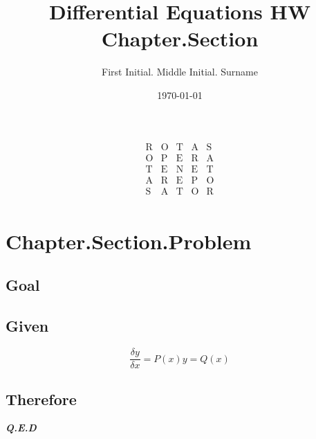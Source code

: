\documentclass{article}
\title{Differential Equations HW Chapter.Section}
\author{First Initial. Middle Initial. Surname }
\date{\today}
\begin{document}
\maketitle



\[\begin{array}{ccccc}
\text{R} & \text{O} & \text{T} & \text{A} & \text{S}\\
\text{O} & \text{P} & \text{E} & \text{R} & \text{A}\\
\text{T} & \text{E} & \text{N} & \text{E} & \text{T}\\
\text{A} & \text{R} & \text{E} & \text{P} & \text{O}\\
\text{S} & \text{A} & \text{T} & \text{O} & \text{R}  \\
\end{array}
\]



\newpage


\newpage
\setcounter{section}{0}
\section{Chapter.Section.Problem}
\subsection{Goal}
\subsection{Given}


$$\frac{\delta y}{\delta x}= P(x)y=Q(x) $$


\subsection{Therefore}
\textbf{\textit{Q.E.D}}


\end{document}
